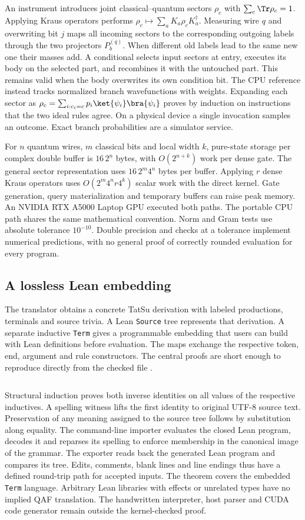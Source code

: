An instrument introduces joint classical--quantum sectors $\rho_c$ with $\sum_c\Tr\rho_c=1$. Applying Kraus operators performs $\rho_c\mapsto\sum_a K_a\rho_c K_a^\dagger$. Measuring wire $q$ and overwriting bit $j$ maps all incoming sectors to the corresponding outgoing labels through the two projectors $P_b^{(q)}$. When different old labels lead to the same new one their masses add. A conditional selects input sectors at entry, executes its body on the selected part, and recombines it with the untouched part. This remains valid when the body overwrites its own condition bit. The CPU reference instead tracks normalized branch wavefunctions with weights. Expanding each sector as $\rho_c=\sum_{i:c_i=c}p_i\ket{\psi_i}\bra{\psi_i}$ proves by induction on instructions that the two ideal rules agree. On a physical device a single invocation samples an outcome. Exact branch probabilities are a simulator service.

For $n$ quantum wires, $m$ classical bits and local width $k$, pure-state storage per complex double buffer is $16\,2^n$ bytes, with $O(2^{n+k})$ work per dense gate. The general sector representation uses $16\,2^m4^n$ bytes per buffer. Applying $r$ dense Kraus operators uses $O(2^m4^n r4^k)$ scalar work with the direct kernel. Gate generation, query materialization and temporary buffers can raise peak memory. An NVIDIA RTX A5000 Laptop GPU executed both paths. The portable CPU path shares the same mathematical convention. Norm and Gram tests use absolute tolerance $10^{-10}$. Double precision and checks at a tolerance implement numerical predictions, with no general proof of correctly rounded evaluation for every program.

\subsection{A lossless Lean embedding}
The translator obtains a concrete TatSu derivation with labeled productions, terminals and source trivia. A Lean \texttt{Source} tree represents that derivation. A separate inductive \texttt{Term} gives a programmable embedding that users can build with Lean definitions before evaluation. The maps exchange the respective token, end, argument and rule constructors. The central proofs are short enough to reproduce directly from the checked file \cite{lean}.
\inputminted[firstline=34,lastline=38,fontsize=\footnotesize]{lean4}{lean/QAF.lean}
Structural induction proves both inverse identities on all values of the respective inductives. A spelling witness lifts the first identity to original UTF-8 source text. Preservation of any meaning assigned to the source tree follows by substitution along equality. The command-line importer evaluates the closed Lean program, decodes it and reparses its spelling to enforce membership in the canonical image of the grammar. The exporter reads back the generated Lean program and compares its tree. Edits, comments, blank lines and line endings thus have a defined round-trip path for accepted inputs. The theorem covers the embedded \texttt{Term} language. Arbitrary Lean libraries with effects or unrelated types have no implied QAF translation. The handwritten interpreter, host parser and CUDA code generator remain outside the kernel-checked proof.

